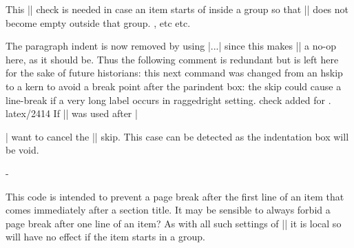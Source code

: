  \begin{macro}{\@item}
    \begin{teX}
\def\@item[#1]{%
  \if@noparitem
    \@donoparitem
  \else
    \if@inlabel
      \indent \par
    \fi
    \ifhmode
      \unskip\unskip \par
    \fi
    \if@newlist
      \if@nobreak
        \@nbitem
      \else
        \addpenalty\@beginparpenalty
        \addvspace\@topsep
        \addvspace{-\parskip}%
      \fi
    \else
      \addpenalty\@itempenalty
      \addvspace\itemsep
    \fi
    \global\@inlabeltrue
  \fi
  \everypar{%
    \@minipagefalse
    \global\@newlistfalse
    \end{teX}
    This |\if@inlabel| check is needed in case an item starts of
    inside a group so that |\everypar| does not become empty
    outside that group. 
 \@nobreakfalse, etc etc.
    \begin{teX}
    \if@inlabel
      \global\@inlabelfalse
    \end{teX}
    The paragraph indent is now removed by using |\setbox...| since
    this makes |\noindent| a no-op here, as it should be. Thus the
    following comment is redundant but is left here for the sake of
    future historians:
    this next command was changed from an hskip to a kern to avoid
    a break point after the parindent box: the skip could cause a
    line-break if a very long label occurs in raggedright setting.
    { check added for . latex/2414}
 If |\noindent| was used after |\item| want to cancel the |\itemindent|
 skip. This case can be detected as the indentation box will be void.
    \begin{teX}
      {\setbox\z@\lastbox
       \ifvoid\z@
         \kern-\itemindent
       \fi}%
    \end{teX}

    \begin{teX}
      \box\@labels
      \penalty\z@
    \fi
    \end{teX}
    This code is intended to prevent a page break after the first
    line of an item that comes immediately after a section title. It
    may be sensible to always forbid a page break after one line of
    an item?  As with all such settings of |\clubpenalty| it is local
    so will have no effect if the item starts in a group.


\end{macro}
